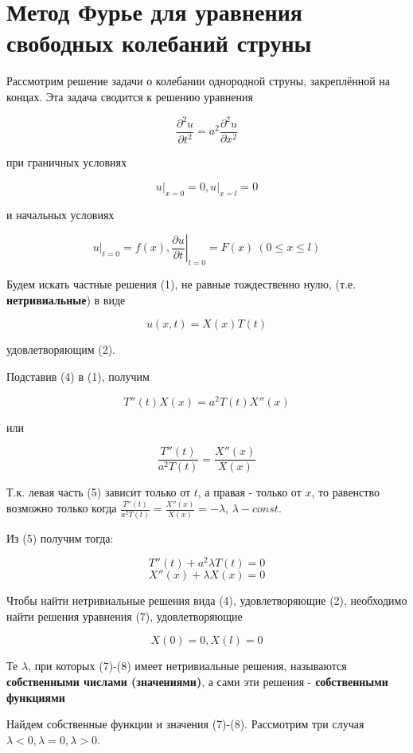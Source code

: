 \section{Метод Фурье для уравнения свободных колебаний струны}

Рассмотрим решение задачи о колебании однородной струны, закреплённой на концах. Эта задача сводится к решению уравнения

\[
	\frac{\partial^2 u}{\partial t^2} = a^2 \frac{\partial^2 u}{\partial x^2} \tag{1}
\]

при граничных условиях

\[
	\left. u\right|_{x=0} =0, \left. u\right|_{x=l}=0 \tag{2}
\]

и начальных условиях

\[
	\left. u\right|_{t=0}=f(x), \left.\frac{\partial u}{\partial t} \right|_{t=0} = F(x) ~ (0 \le x \le l) \tag{3}
\]

Будем искать частные решения (1), не равные тождественно нулю, (т.е. \textbf{нетривиальные}) в виде

\[
	u(x, t)=X(x)T(t) \tag{4}
\]

удовлетворяющим (2).

Подставив (4) в (1), получим

\[
	T''(t) X(x) = a^2 T(t) X''(x)
\]

или

\[
	\frac{T''(t)}{a^2 T(t)} = \frac{X''(x)}{X(x)} \tag{5}
\]

Т.к. левая часть (5) зависит только от $t$, а правая - только от $x$, то равенство возможно только когда $\frac{T''(t)}{a^2 T(t)}=\frac{X''(x)}{X(x)}=-\lambda$, $\lambda - const$.

Из (5) получим тогда:

\[
	T''(t) + a^2 \lambda T(t)=0 \tag{6}
\]
\[
	X''(x) + \lambda X(x) = 0 \tag{7}
\]

Чтобы найти нетривиальные решения вида (4), удовлетворяющие (2), необходимо найти решения уравнения (7), удовлетворяющие

\[
	X(0)=0, X(l)=0 \tag{8}
\]

Те $\lambda$, при которых (7)-(8) имеет нетривиальные решения, называются \textbf{собственными числами (значениями)}, а сами эти решения - \textbf{собственными функциями}

Найдем собственные функции и значения (7)-(8). Рассмотрим три случая $\lambda<0, \lambda=0, \lambda>0$.

